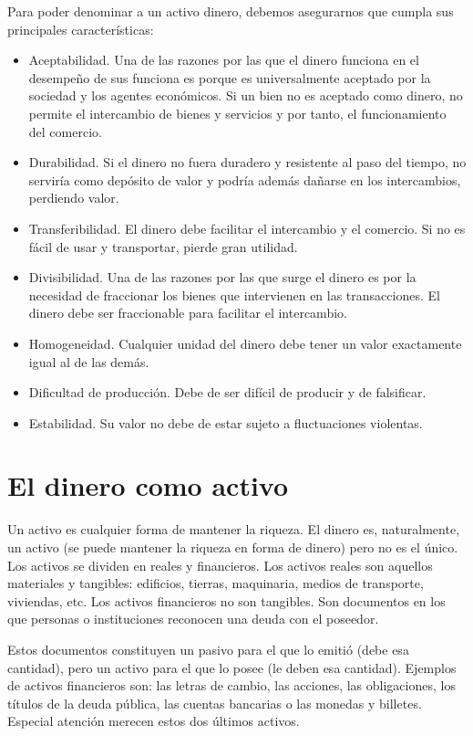 \documentclass[
]{krantz}
\providecommand{\tightlist}{%
  \setlength{\itemsep}{0pt}\setlength{\parskip}{0pt}}
\begin{document}
Para poder denominar a un activo dinero, debemos asegurarnos que cumpla sus principales características:

\begin{itemize}
\tightlist
\item
  Aceptabilidad. Una de las razones por las que el dinero funciona en el desempeño de sus funciona es porque es universalmente aceptado por la sociedad y los agentes económicos. Si un bien no es aceptado como dinero, no permite el intercambio de bienes y servicios y por tanto, el funcionamiento del comercio.
\item
  Durabilidad. Si el dinero no fuera duradero y resistente al paso del tiempo, no serviría como depósito de valor y podría además dañarse en los intercambios, perdiendo valor.
\item
  Transferibilidad. El dinero debe facilitar el intercambio y el comercio. Si no es fácil de usar y transportar, pierde gran utilidad.
\item
  Divisibilidad. Una de las razones por las que surge el dinero es por la necesidad de fraccionar los bienes que intervienen en las transacciones. El dinero debe ser fraccionable para facilitar el intercambio.
\item
  Homogeneidad. Cualquier unidad del dinero debe tener un valor exactamente igual al de las demás.
\item
  Dificultad de producción. Debe de ser difícil de producir y de falsificar.
\item
  Estabilidad. Su valor no debe de estar sujeto a fluctuaciones violentas.
\end{itemize}

\hypertarget{el-dinero-como-activo}{%
\section{El dinero como activo}\label{el-dinero-como-activo}}

Un activo es cualquier forma de mantener la riqueza. El dinero es, naturalmente, un activo (se puede mantener la riqueza en forma de dinero) pero no es el único. Los activos se dividen en reales y financieros. Los activos reales son aquellos materiales y tangibles: edificios, tierras, maquinaria, medios de transporte, viviendas, etc. Los activos financieros no son tangibles. Son documentos en los que personas o instituciones reconocen una deuda con el poseedor.

Estos documentos constituyen un pasivo para el que lo emitió (debe esa cantidad), pero un activo para el que lo posee (le deben esa cantidad). Ejemplos de activos financieros son: las letras de cambio, las acciones, las obligaciones, los títulos de la deuda pública, las cuentas bancarias o las monedas y billetes. Especial atención merecen estos dos últimos activos.
\end{document}
